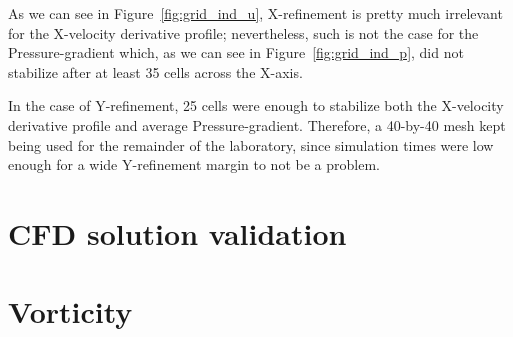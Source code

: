 \documentclass[12pt]{article}
\begin{document}
        As we can see in Figure~\ref{fig:grid_ind_u}, X-refinement is pretty much irrelevant for the X-velocity derivative profile; nevertheless, such is not the case for the Pressure-gradient which, as we can see in Figure~\ref{fig:grid_ind_p}, did not stabilize after at least 35 cells across the X-axis.

        In the case of Y-refinement, 25 cells were enough to stabilize both the X-velocity derivative profile and average Pressure-gradient. Therefore, a 40-by-40 mesh kept being used for the remainder of the laboratory, since simulation times were low enough for a wide Y-refinement margin to not be a problem.

\section{CFD solution validation} \label{sec:CFD_validation}

\section{Vorticity} \label{sec:vorticity}



\end{document}

